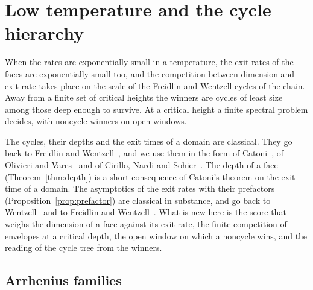 \section{Low temperature and the cycle hierarchy}\label{sec:lowtemp}

When the rates are exponentially small in a temperature, the exit rates of
the faces are exponentially small too, and the competition between dimension
and exit rate takes place on the scale of the Freidlin and Wentzell cycles of
the chain. Away from a finite set of critical heights the winners are cycles
of least size among those deep enough to survive. At a critical height a
finite spectral problem decides, with noncycle winners on open windows.

The cycles, their depths and the exit times of a domain are classical. They
go back to Freidlin and Wentzell~\cite{freidlinwentzell2012}, and we use them
in the form of Catoni~\cite{catoni1999}, of Olivieri and
Vares~\cite[Chapter~6]{olivierivares2005} and of Cirillo, Nardi and
Sohier~\cite{cirillonardisohier2015}. The depth of a face
(Theorem~\ref{thm:depth}) is a short consequence of Catoni's theorem on the
exit time of a domain. The asymptotics of the exit rates with their
prefactors (Proposition~\ref{prop:prefactor}) are classical in substance, and
go back to Wentzell~\cite{wentzell1972} and to Freidlin and
Wentzell~\cite[Chapter~6]{freidlinwentzell2012}. What is new here is the score
that weighs the dimension of a face against its exit rate, the finite
competition of envelopes at a critical depth, the open window on which a
noncycle wins, and the reading of the cycle tree from the winners.

\subsection{Arrhenius families}\label{sec:arrhenius}

